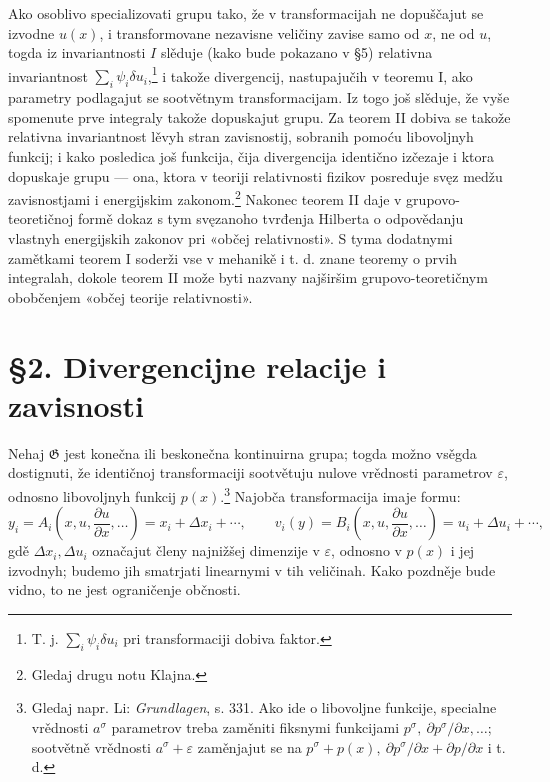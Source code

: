 \documentclass[11pt]{article}
\providecommand{\G}{\mathfrak G}
\providecommand{\eps}{\varepsilon}
\providecommand{\D}{\Delta}
\providecommand{\p}{\partial}
\begin{document}
Ako osoblivo specializovati grupu tako, že v transformacijah ne dopuščajut se izvodne \(u(x)\), i transformovane nezavisne veličiny zavise samo od \(x\), ne od \(u\), togda iz invariantnosti \(I\) slěduje (kako bude pokazano v \S{}5) relativna invariantnost \(\sum_i\psi_i\delta u_i\),\footnote{T. j. \(\sum_i\psi_i\delta u_i\) pri transformaciji dobiva faktor.} i takože divergencij, nastupajučih v teoremu I, ako parametry podlagajut se sootvětnym transformacijam. Iz togo još slěduje, že vyše spomenute prve integraly takože dopuskajut grupu. Za teorem II dobiva se takože relativna invariantnost lěvyh stran zavisnostij, sobranih pomoću libovoljnyh funkcij; i kako posledica još funkcija, čija divergencija identično izčezaje i ktora dopuskaje grupu --- ona, ktora v teoriji relativnosti fizikov posreduje svęz medžu zavisnostjami i energijskim zakonom.\footnote{Gledaj drugu notu Klajna.} Nakonec teorem II daje v grupovo-teoretičnoj formě dokaz s tym svęzanoho tvrđenja Hilberta o odpovědanju vlastnyh energijskih zakonov pri «občej relativnosti». S tyma dodatnymi zamětkami teorem I soderži vse v mehanikě i t. d. znane teoremy o prvih integralah, dokole teorem II može byti nazvany najširšim grupovo-teoretičnym obobčenjem «občej teorije relativnosti».

\section*{\S{}2. Divergencijne relacije i zavisnosti}

Nehaj \(\G\) jest konečna ili beskonečna kontinuirna grupa; togda možno vsěgda dostignuti, že identičnoj transformaciji sootvětuju nulove vrědnosti parametrov \(\eps\), odnosno libovoljnyh funkcij \(p(x)\).\footnote{Gledaj napr. Li: \emph{Grundlagen}, s. 331. Ako ide o libovoljne funkcije, specialne vrědnosti \(a^\sigma\) parametrov treba zaměniti fiksnymi funkcijami \(p^\sigma,\ \p p^\sigma/\p x,\ldots\); sootvětně vrědnosti \(a^\sigma+\eps\) zaměnjajut se na \(p^\sigma+p(x),\ \p p^\sigma/\p x+\p p/\p x\) i t. d.} Najobča transformacija imaje formu:
\[
y_i=A_i\!\left(x,u,\frac{\p u}{\p x},\ldots\right)=x_i+\D x_i+\cdots,\qquad
v_i(y)=B_i\!\left(x,u,\frac{\p u}{\p x},\ldots\right)=u_i+\D u_i+\cdots,
\]
gdě \(\D x_i,\D u_i\) označajut členy najnižšej dimenzije v \(\eps\), odnosno v \(p(x)\) i jej izvodnyh; budemo jih smatrjati linearnymi v tih veličinah. Kako pozdněje bude vidno, to ne jest ograničenje občnosti.
\end{document}
